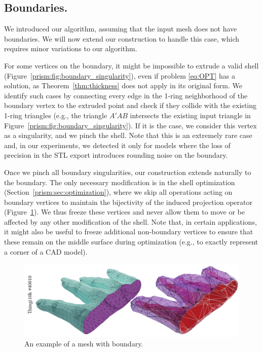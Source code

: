 \subsection{Boundaries.}\label{prism:sec:boundaries}

We introduced our algorithm, assuming that the input mesh does not have boundaries. We will now extend our construction to handle this case, which requires minor variations to our algorithm.

For some vertices on the boundary, it might be impossible to extrude a valid shell (Figure~\ref{prism:fig:boundary_singularity}), even if problem \eqref{eq:OPT} has a solution, as  Theorem~\ref{thm:thickness} does not apply in its original form. 
%
We identify such cases by connecting every edge in the 1-ring neighborhood of the boundary vertex
to the extruded point and check if they collide with the existing 1-ring triangles (e.g., the triangle $A'AB$ intersects the existing input triangle in Figure~\ref{prism:fig:boundary_singularity}). If it is the case, we consider this vertex as a singularity, and we pinch the shell. Note that this is an extremely rare case and, in our experiments, we detected it only for models where the loss of precision in the STL export introduces rounding noise on the boundary.%

Once we pinch all boundary singularities, our construction extends naturally to the boundary. The only necessary modification is in the shell optimization (Section~\ref{prism:sec:optimization}), where we skip all operations acting on boundary vertices to maintain the bijectivity of the induced projection operator (Figure~\ref{prism:fig:open-hand}).
%
We thus freeze these vertices and never allow them to move or be affected by any other modification of the shell. Note that, in certain applications, it might also be useful to freeze additional non-boundary vertices to ensure that these remain on the middle surface during optimization (e.g., to exactly represent a corner of a CAD model).


\begin{figure}
    \centering
    \includegraphics[width=0.9\linewidth]{prism-tex/figs/open-hand}
    \caption{An example of a mesh with boundary.}
    \label{prism:fig:open-hand}
    
\end{figure}




